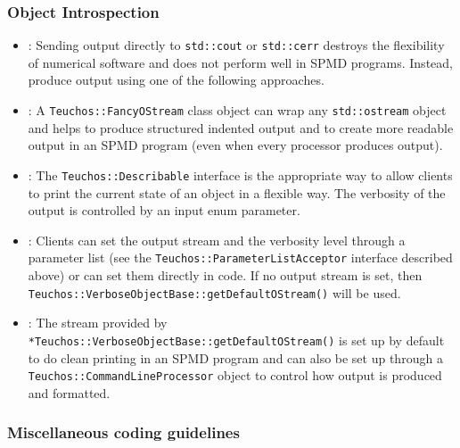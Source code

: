 %
\subsubsection{Object Introspection}
%


\begin{itemize}


{}\item\GCGStdStream: Sending output directly to {}\texttt{std\-::cout} or
{}\texttt{std\-::cerr} destroys the flexibility of numerical software and does
not perform well in SPMD programs.  Instead, produce output using one of the
following approaches.


{}\item\GCGTeuchosFancyOStream: A {}\texttt{Teuchos\-::Fancy\-OStream} class
object can wrap any {}\texttt{std\-::ostream} object and helps to produce
structured indented output and to create more readable output in an SPMD
program (even when every processor produces output).


{}\item\GCGTeuchosDescribable: The {}\texttt{Teuchos\-::Describable} interface
is the appropriate way to allow clients to print the current state of an
object in a flexible way.  The verbosity of the output is controlled by an
input enum parameter.


{}\item\GCGTeuchosVerboseObject: Clients can set the output stream and the
verbosity level through a parameter list (see the
{}\texttt{Teuchos\-::ParameterListAcceptor} interface described above) or can
set them directly in code.  If no output stream is set, then
{}\texttt{Teuchos\-::Verbose\-Object\-Base\-::get\-Default\-OStream()} will be
used.


{}\item\GCGTeuchosVerboseObjectBaseDefaultOStream: The stream provided by
{}\texttt{*Teuchos\-::Verbose\-Object\-Base\-::get\-Default\-OStream()} is set
up by default to do clean printing in an SPMD program and can also be set up
through a {}\texttt{Teuchos\-::Command\-Line\-Processor} object to control how
output is produced and formatted.


\end{itemize}


%
\subsubsection{Miscellaneous coding guidelines}
%


